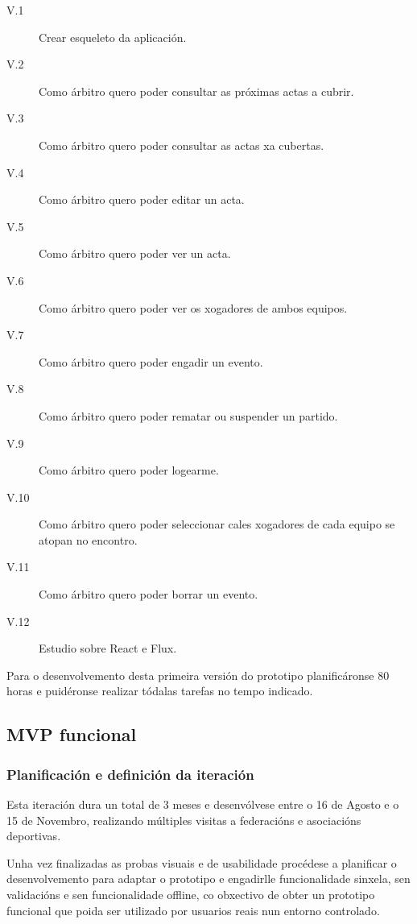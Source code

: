       \begin{description}
        \item [V.1] Crear esqueleto da aplicación.
        \item [V.2] Como árbitro quero poder consultar as próximas actas a 
cubrir.
        \item [V.3] Como árbitro quero poder consultar as actas xa cubertas.
        \item [V.4] Como árbitro quero poder editar un acta.
        \item [V.5] Como árbitro quero poder ver un acta.
        \item [V.6] Como árbitro quero poder ver os xogadores de ambos equipos.
        \item [V.7] Como árbitro quero poder engadir un evento.
        \item [V.8] Como árbitro quero poder rematar ou suspender un partido.
        \item [V.9] Como árbitro quero poder logearme.
        \item [V.10] Como árbitro quero poder seleccionar cales xogadores de 
cada equipo se atopan no encontro.
        \item [V.11] Como árbitro quero poder borrar un evento.
        \item [V.12] Estudio sobre React e Flux.
       \end{description}

       Para o desenvolvemento desta primeira versión do prototipo 
planificáronse 80 horas e puidéronse realizar tódalas tarefas no tempo indicado.

    \subsection{MVP funcional}

      \subsubsection{Planificación e definición da iteración}
      Esta iteración dura un total de 3 meses e desenvólvese entre o 16 de 
Agosto e o 15 de Novembro, realizando múltiples visitas a federacións e 
asociacións deportivas.

      Unha vez finalizadas as probas visuais e de usabilidade procédese 
a planificar o desenvolvemento para adaptar o prototipo e engadirlle 
funcionalidade sinxela, sen validacións e sen funcionalidade offline, co 
obxectivo de obter un prototipo funcional que poida ser utilizado por usuarios 
reais nun entorno controlado.

